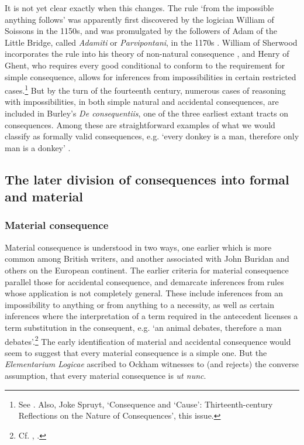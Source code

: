 \documentclass[]{article}
\begin{document}
It is not yet clear exactly when this changes. The rule `from the impossible anything follows' was apparently first discovered by the logician William of Soissons in the 1150s, and was promulgated by the followers of Adam of the Little Bridge, called \textit{Adamiti} or \textit{Parvipontani}, in the 1170s \autocite{Martin1986,Martin2012}. William of Sherwood incorporates the rule into his theory of non-natural consequence \autocite[152]{SherwoodNewSyncategoremata}, and Henry of Ghent, who requires every good conditional to conform to the requirement for simple consequence, allows for inferences from impossibilities in certain restricted cases.\footnote{See \autocite{Spruyt1993}. Also, Joke Spruyt, `Consequence and `Cause': Thirteenth-century Reflections on the Nature of Consequences', this issue.} But by the turn of the fourteenth century, numerous cases of reasoning with impossibilities, in both simple natural and accidental consequences, are included in Burley's \textit{De consequentiis}, one of the three earliest extant tracts on consequences. Among these are straightforward examples of what we would classify as formally valid consequences, e.g. `every donkey is a man, therefore only man is a donkey' \autocite[II. par. 37, p. 119]{Green-Pedersen1980b}.





\subsection{The later division of consequences into formal and material}
\subsubsection{Material consequence}
Material consequence is understood in two ways, one earlier which is more common among British writers, and another associated with John Buridan and others on the European continent. The earlier criteria for material consequence parallel those for accidental consequence, and demarcate inferences from rules whose application is not completely general. These include inferences from an impossibility to anything or from anything to a necessity, as well as certain inferences where the interpretation of a term required in the antecedent licenses a term substitution in the consequent, e.g. `an animal debates, therefore a man debates'.\footnote{Cf. \autocite[VIII. par. 70, p. 128; X. par. 168, pp. 162-163.]{Green-Pedersen1980b}, \autocite[VI, c. 4, 163.8-13]{OckhamEL}.} The early identification of material and accidental consequence would seem to suggest that every material consequence is a simple one. But the \textit{Elementarium Logicae} ascribed to Ockham witnesses to (and rejects) the converse assumption, that every material consequence is \textit{ut nunc}.
\end{document}
